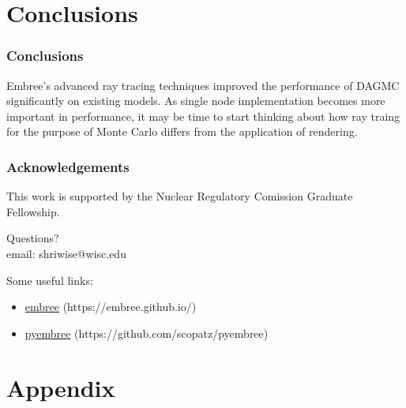 \documentclass[12pt]{beamer}
\begin{document}
\section{Conclusions}

\begin{frame}
\frametitle{Conclusions}

Embree's advanced ray tracing techniques improved the performance of DAGMC significantly on existing models. 
\vfill
As single node implementation becomes more important in performance, it may be time to start thinking about how ray traing for the purpose of Monte Carlo differs from the application of rendering.
\vfill

\end{frame}

\begin{frame}
  \frametitle{Acknowledgements}
  \begin{center}
    This work is supported by the Nuclear Regulatory Comission Graduate Fellowship.
    \end{center}
\end{frame}

\begin{frame}

\begin{center}
\vfill
\huge {Questions?} \\
\vfill
\normalsize email: shriwise@wisc.edu
\vfill
\end{center}
\normalsize
Some useful links:
\begin{itemize}
\item \href{https://embree.github.io/}{{\color{blue}embree}} (https://embree.github.io/)
\item \href{https://github.com/scopatz/pyembree}{{\color{blue}pyembree}} (https://github.com/scopatz/pyembree)
\end{itemize}

\end{frame}

\begin{frame}
  
  \footnotesize{}
\end{frame}

\section{Appendix}
\end{document}
